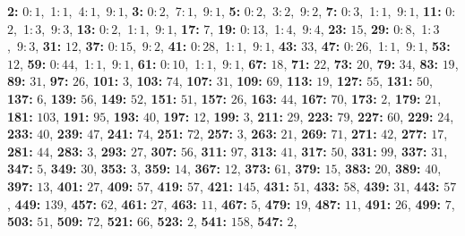 \textsf{\bfseries 2:} 0:\,$1$,\ 1:\,$1$,\ 4:\,$1$,\ 9:\,$1$, \textsf{\bfseries 3:} 0:\,$2$,\ 7:\,$1$,\ 9:\,$1$, \textsf{\bfseries 5:} 0:\,$2$,\ 3:\,$2$,\ 9:\,$2$, \textsf{\bfseries 7:} 0:\,$3$,\ 1:\,$1$,\ 9:\,$1$, \textsf{\bfseries 11:} 0:\,$2$,\ 1:\,$3$,\ 9:\,$3$, \textsf{\bfseries 13:} 0:\,$2$,\ 1:\,$1$,\ 9:\,$1$, \textsf{\bfseries 17:} $7$, \textsf{\bfseries 19:} 0:\,$13$,\ 1:\,$4$,\ 9:\,$4$, \textsf{\bfseries 23:} $15$, \textsf{\bfseries 29:} 0:\,$8$,\ 1:\,$3$,\ 9:\,$3$, \textsf{\bfseries 31:} $12$, \textsf{\bfseries 37:} 0:\,$15$,\ 9:\,$2$, \textsf{\bfseries 41:} 0:\,$28$,\ 1:\,$1$,\ 9:\,$1$, \textsf{\bfseries 43:} $33$, \textsf{\bfseries 47:} 0:\,$26$,\ 1:\,$1$,\ 9:\,$1$, \textsf{\bfseries 53:} $12$, \textsf{\bfseries 59:} 0:\,$44$,\ 1:\,$1$,\ 9:\,$1$, \textsf{\bfseries 61:} 0:\,$10$,\ 1:\,$1$,\ 9:\,$1$, \textsf{\bfseries 67:} $18$, \textsf{\bfseries 71:} $22$, \textsf{\bfseries 73:} $20$, \textsf{\bfseries 79:} $34$, \textsf{\bfseries 83:} $19$, \textsf{\bfseries 89:} $31$, \textsf{\bfseries 97:} $26$, \textsf{\bfseries 101:} $3$, \textsf{\bfseries 103:} $74$, \textsf{\bfseries 107:} $31$, \textsf{\bfseries 109:} $69$, \textsf{\bfseries 113:} $19$, \textsf{\bfseries 127:} $55$, \textsf{\bfseries 131:} $50$, \textsf{\bfseries 137:} $6$, \textsf{\bfseries 139:} $56$, \textsf{\bfseries 149:} $52$, \textsf{\bfseries 151:} $51$, \textsf{\bfseries 157:} $26$, \textsf{\bfseries 163:} $44$, \textsf{\bfseries 167:} $70$, \textsf{\bfseries 173:} $2$, \textsf{\bfseries 179:} $21$, \textsf{\bfseries 181:} $103$, \textsf{\bfseries 191:} $95$, \textsf{\bfseries 193:} $40$, \textsf{\bfseries 197:} $12$, \textsf{\bfseries 199:} $3$, \textsf{\bfseries 211:} $29$, \textsf{\bfseries 223:} $79$, \textsf{\bfseries 227:} $60$, \textsf{\bfseries 229:} $24$, \textsf{\bfseries 233:} $40$, \textsf{\bfseries 239:} $47$, \textsf{\bfseries 241:} $74$, \textsf{\bfseries 251:} $72$, \textsf{\bfseries 257:} $3$, \textsf{\bfseries 263:} $21$, \textsf{\bfseries 269:} $71$, \textsf{\bfseries 271:} $42$, \textsf{\bfseries 277:} $17$, \textsf{\bfseries 281:} $44$, \textsf{\bfseries 283:} $3$, \textsf{\bfseries 293:} $27$, \textsf{\bfseries 307:} $56$, \textsf{\bfseries 311:} $97$, \textsf{\bfseries 313:} $41$, \textsf{\bfseries 317:} $50$, \textsf{\bfseries 331:} $99$, \textsf{\bfseries 337:} $31$, \textsf{\bfseries 347:} $5$, \textsf{\bfseries 349:} $30$, \textsf{\bfseries 353:} $3$, \textsf{\bfseries 359:} $14$, \textsf{\bfseries 367:} $12$, \textsf{\bfseries 373:} $61$, \textsf{\bfseries 379:} $15$, \textsf{\bfseries 383:} $20$, \textsf{\bfseries 389:} $40$, \textsf{\bfseries 397:} $13$, \textsf{\bfseries 401:} $27$, \textsf{\bfseries 409:} $57$, \textsf{\bfseries 419:} $57$, \textsf{\bfseries 421:} $145$, \textsf{\bfseries 431:} $51$, \textsf{\bfseries 433:} $58$, \textsf{\bfseries 439:} $31$, \textsf{\bfseries 443:} $57$, \textsf{\bfseries 449:} $139$, \textsf{\bfseries 457:} $62$, \textsf{\bfseries 461:} $27$, \textsf{\bfseries 463:} $11$, \textsf{\bfseries 467:} $5$, \textsf{\bfseries 479:} $19$, \textsf{\bfseries 487:} $11$, \textsf{\bfseries 491:} $26$, \textsf{\bfseries 499:} $7$, \textsf{\bfseries 503:} $51$, \textsf{\bfseries 509:} $72$, \textsf{\bfseries 521:} $66$, \textsf{\bfseries 523:} $2$, \textsf{\bfseries 541:} $158$, \textsf{\bfseries 547:} $2$, 
